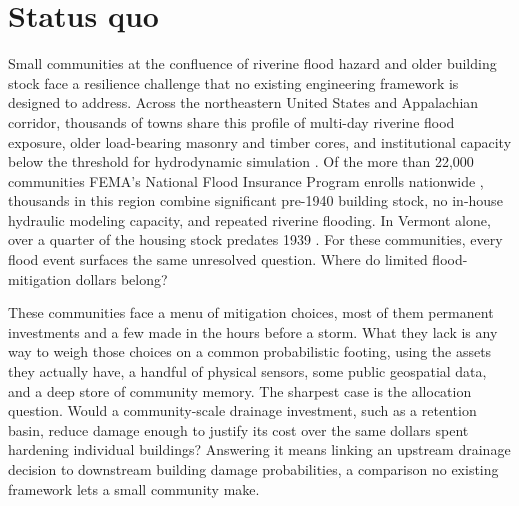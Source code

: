 \documentclass[11pt]{article}
\begin{document}

\section{Status quo}
Small communities at the confluence of riverine flood hazard and older building
stock face a resilience challenge that no existing engineering framework is designed
to address.
Across the northeastern United States and Appalachian corridor, thousands of towns
share this profile of multi-day riverine flood exposure, older load-bearing masonry
and timber cores, and institutional capacity below the threshold for hydrodynamic
simulation \cite{smith2013statecapacity,horney2012ruralstatus}.
Of the more than 22,000 communities FEMA's National Flood Insurance Program enrolls
nationwide \cite{horn2024nfip}, thousands in this region combine significant
pre-1940 building stock, no in-house hydraulic modeling capacity, and repeated
riverine flooding.
In Vermont alone, over a quarter of the housing stock predates 1939
\cite{census2017b25034,vhfa2020housingneeds}.
For these communities, every flood event surfaces the same unresolved question.
Where do limited flood-mitigation dollars belong?

These communities face a menu of mitigation choices, most of them permanent
investments and a few made in the hours before a storm.
What they lack is any way to weigh those choices on a common probabilistic footing,
using the assets they actually have, a handful of physical sensors, some public
geospatial data, and a deep store of community memory.
The sharpest case is the allocation question.
Would a community-scale drainage investment, such as a retention basin, reduce damage
enough to justify its cost over the same dollars spent hardening individual buildings?
Answering it means linking an upstream drainage decision to downstream building
damage probabilities, a comparison no existing framework lets a small community make.
\end{document}
